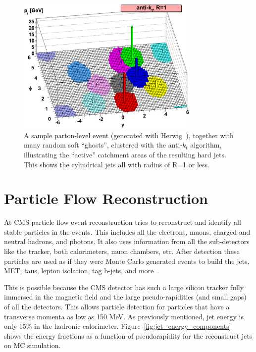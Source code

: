 \begin{figure}

\includegraphics[width=0.79\textwidth]{Reconstruction/herwig-parton-level-ev-antikt-R1-ghosted4root.eps}
\centering
\caption{A sample parton-level event (generated with
    Herwig~\cite{Herwig}), together with many random soft ``ghosts'',
    clustered with the anti-$k_t$ algorithm, illustrating the
    ``active'' catchment areas of the resulting hard jets. This shows the cylindrical jets all with radius of R=1 or less.~\cite{1126-6708-2008-04-063}}
\label{fig:anti_atk}
\end{figure}

\section{Particle Flow Reconstruction}

At CMS particle-flow event reconstruction tries to reconstruct and identify all stable particles in the events.  This includes all the electrons, muons, charged and neutral hadrons, and photons.  It also uses information from all the sub-detectors like the tracker, both calorimeters, muon chambers, etc. After detection these particles are used as if they were Monte Carlo generated events to build the jets, MET, taus, lepton isolation, tag b-jets, and more~\cite{particleflow}.

This is possible because the CMS detector has such a large silicon tracker fully immersed in the magnetic field and the large pseudo-rapidities (and small gaps) of all the detectors.  This allows particle detection for particles that have a transverse momenta as low as 150 MeV.  As previously mentioned, jet energy is only 15\% in the hadronic calorimeter. Figure~\ref{fig:jet_energy_components}~\cite{Pandolfi_thesis} shows the energy fractions as a function of pseudorapidity for the reconstruct jets on MC simulation.  


